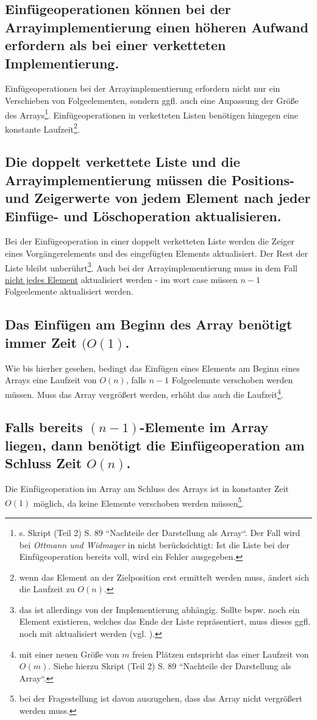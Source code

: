 \subsection*{Einfügeoperationen können bei der Arrayimplementierung einen höheren Aufwand erfordern als bei einer verketteten Implementierung.}
Einfügeoperationen bei der Arrayimplementierung erfordern nicht nur ein Verschieben von Folgeelementen, sondern {ggfl.} auch eine Anpassung der Größe des Arrays\footnote{
    s. Skript (Teil 2) S. 89 ``Nachteile der Darstellung als Array``. Der Fall wird bei \textit{Ottmann und Widmayer} in \cite[32]{OW17a} nicht berücksichtigt: Ist die Liste bei der Einfügeoperation bereits voll, wird ein Fehler ausgegeben.
}.
Einfügeoperationen in verketteten Listen benötigen hingegen eine konstante Laufzeit\footnote{
    wenn das Element an der Zielposition erst ermittelt werden muss, ändert sich die Laufzeit zu $O(n)$.
}.

\subsection*{Die doppelt verkettete Liste und die Arrayimplementierung müssen die Positions- und Zeigerwerte von jedem Element nach jeder Einfüge- und Löschoperation aktualisieren.}
Bei der Einfügeoperation in einer doppelt verketteten Liste werden die Zeiger eines Vorgängerelements und des eingefügten Elements aktualisiert.
Der Rest der Liste bleibt unberührt\footnote{
das ist allerdings von der Implementierung abhängig. Sollte bspw. noch ein Element existieren, welches das Ende der Liste repräsentiert, muss dieses ggfl. noch mit aktualisiert werden (vgl. \cite[35 ff.]{OW17a}).
}.
Auch bei der Arrayimplementierung muss in dem Fall \underline{nicht jedes Element} aktualisiert werden - im wort case müssen $n-1$ Folgeelemente aktualisiert werden.


\subsection*{Das Einfügen am Beginn des Array benötigt immer Zeit $(O(1)$.}
Wie bis hierher gesehen, bedingt das Einfügen eines Elements am Beginn eines Arrays eine Laufzeit von $O(n)$, falls $n-1$ Folgeelemnte verschoben werden müssen.
Muss das Array vergrößert werden, erhöht das auch die Laufzeit\footnote{
    mit einer neuen Größe von $m$ freien Plätzen entspricht das einer Laufzeit von $O(m)$. Siehe hierzu Skript (Teil 2) S. 89 ``Nachteile der Darstellung als Array``.
}.

\subsection*{Falls bereits $(n-1)$-Elemente im Array liegen, dann benötigt die Einfügeoperation am Schluss Zeit $O(n)$.}
Die Einfügeoperation im Array am Schluss des Arrays ist in konstanter Zeit $O(1)$ möglich, da keine Elemente verschoben werden müssen\footnote{
    bei der Fragestellung ist davon auszugehen, dass das Array nicht vergrößert werden muss.
}.


